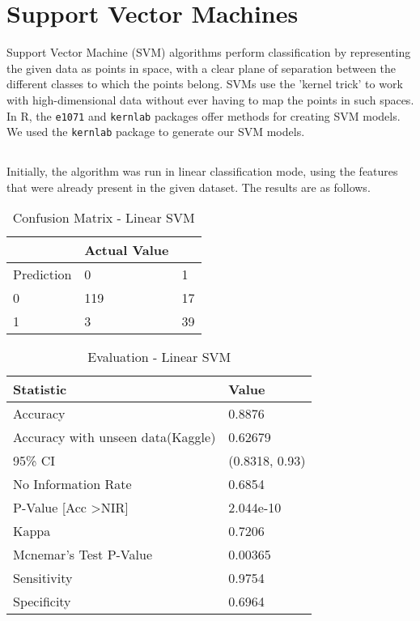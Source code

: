 \documentclass[a4paper,10pt]{report}\usepackage[]{graphicx}\usepackage[]{color}
\begin{document}
\section{Support Vector Machines}

Support Vector Machine (SVM) algorithms perform classification by representing the given data as points in space, with a clear plane of separation between the different classes to which the points belong. SVMs use the 'kernel trick' to work with high-dimensional data without ever having to map the points in such spaces. 
In R, the \texttt{e1071} and \texttt{kernlab} packages offer methods for creating SVM models. We used the \texttt{kernlab} package to generate our SVM models.

\subsection{}
Initially, the algorithm was run in linear classification mode, using the features that were already present in the given dataset. The results are as follows.
\begin{table}
    \begin{tabular}{|l|l|l|}
    \hline
    ~          & Actual Value  & ~  \\ \hline
    Prediction & 0             & 1  \\ \hline
    0          & 119           & 17 \\
    1          & 3             & 39 \\ \hline
    \end{tabular}
    \caption{Confusion Matrix - Linear SVM}
\end{table}

\begin{table}
    \begin{tabular}{|l|l|}
    \hline
    Statistic              & Value           \\ \hline
    Accuracy               & 0.8876          \\
    Accuracy with unseen data(Kaggle)               & 0.62679 \\ 
    95\% CI                & (0.8318, 0.93) \\
    No Information Rate    & 0.6854          \\
    P-Value [Acc \textgreater NIR]    &  2.044e-10      \\
    Kappa                  &  0.7206         \\
    Mcnemar's Test P-Value & 0.00365          \\
    Sensitivity            &  0.9754         \\
    Specificity            & 0.6964          \\ \hline
    \end{tabular}
    \caption{Evaluation - Linear SVM}
\end{table}
\end{document}
